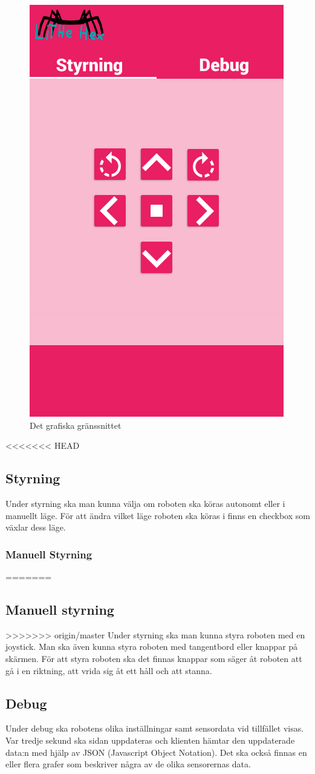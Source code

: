 \documentclass[a4paper,titlepage,12pt]{article}
\begin{document}
	\begin{figure}[h]
		\centering
		\includegraphics[width=0.5\linewidth]{images/gui-index.png}
		\caption{Det grafiska gränssnittet\label{fig:gui-overview}}
	\end{figure}
<<<<<<< HEAD

    \subsection{Styrning}
    Under styrning ska man kunna välja om roboten ska köras autonomt eller i manuellt läge.
    För att ändra vilket läge roboten ska köras i finns en checkbox som växlar dess läge.
    \subsubsection{Manuell Styrning}
=======
    
    \subsection{Manuell styrning}
>>>>>>> origin/master
    Under styrning ska man kunna styra roboten med en joystick. Man ska även
    kunna styra roboten med tangentbord eller knappar på skärmen. För att styra
    roboten ska det finnas knappar som säger åt roboten att gå i en riktning,
    att vrida sig åt ett håll och att stanna.

    \subsection{Debug}
	Under debug ska robotens olika inställningar samt sensordata vid tillfället
    visas. Var tredje sekund ska sidan uppdateras och klienten hämtar den
    uppdaterade data:n med hjälp av JSON (Javascript Object Notation). Det ska
    också finnas en eller flera grafer som beskriver några av de olika
    sensorernas data.
\end{document}
